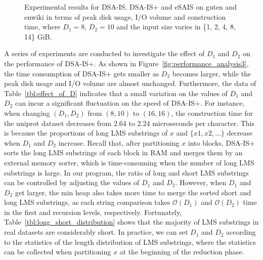 \documentclass[10pt,journal,compsoc]{IEEEtran}
\begin{document}
\begin{figure}[htbp]
{\begin{minipage}[b]{0.45\textwidth}
		\end{minipage}
	}
	\caption{Experimental results for DSA-IS, DSA-IS+ and eSAIS on guten and enwiki in terms of peak disk usage, I/O volume and construction time, where $D_1 = 8$, $D_2 = 10$ and the input size varies in \{1, 2, 4, 8, 14\} GiB. }
	\label{fig:performance_analysis2}
\end{figure}


A series of experiments are conducted to investigate the effect of $D_1$ and $D_2$ on the performance of DSA-IS+. As shown in Figure~\ref{fig:performance_analysis3}, the time consumption of DSA-IS+ gets smaller as $D_2$ becomes larger, while the peak disk usage and I/O volume are almost unchanged. Furthermore, the data of Table~\ref{tbl:effect_of_D} indicates that a small variation on the values of $D_1$ and $D_2$ can incur a significant fluctuation on the speed of DSA-IS+. For instance, when changing $(D_1, D_2)$ from $(8, 10)$ to $(16, 16)$, the construction time for the uniprot dataset decreases from 2.64 to 2.24 microseconds per character. This is because the proportions of long LMS substrings of $x$ and $\{x1, x2,...\}$ decrease when $D_1$ and $D_2$ increase. Recall that, after partitioning $x$ into blocks, DSA-IS+ sorts the long LMS substrings of each block in RAM and merges them by an external memory sorter, which is time-consuming when the number of long LMS substrings is large. In our program, the ratio of long and short LMS substrings can be controlled by adjusting the values of $D_1$ and $D_2$. However, when $D_1$ and $D_2$ get larger, the min heap also takes more time to merge the sorted short and long LMS substrings, as each string comparison takes $\mathcal{O}(D_1)$ and $\mathcal{O}(D_2)$ time in the first and recursion levels, respectively. Fortunately, Table~\ref{tbl:long_short_distribution} shows that the majority of LMS substrings in real datasets are considerably short. In practice, we can set $D_1$ and $D_2$ according to the statistics of the length distribution of LMS substrings, where the statistics can be collected when partitioning $x$ at the beginning of the reduction phase.
\end{document}
